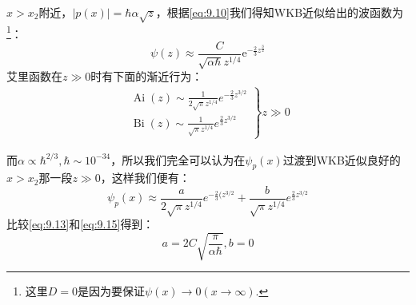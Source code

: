 \documentclass[a4paper,zihao=-4,linespread=1]{ctexrep}
\begin{document}
    $x>x_2$附近，$|p(x)|=\hbar\alpha\sqrt{z}$，根据\ref{eq:9.10}我们得知WKB近似给出的波函数为\footnote{这里$D=0$是因为要保证$\psi(x)\to 0(x\to\infty)$.}：
    \begin{equation}
        \label{eq:9.13}
        \psi(z)\approx\frac{C}{\sqrt{\alpha\hbar}z^{1/4}}\mathrm{e}^{-\frac{2}{3}z^{\frac{3}{2}}}
    \end{equation}
    艾里函数在$z\gg 0$时有下面的渐近行为：
    \begin{eqnarray}
        \left.\begin{array}{l}
            \operatorname{Ai}(z) \sim \frac{1}{2 \sqrt{\pi} z^{1 / 4}} e^{-\frac{2}{3} z^{3 / 2}} \\
            \operatorname{Bi}(z) \sim \frac{1}{\sqrt{\pi} z^{1 / 4}} e^{\frac{2}{3} z^{3 / 2}}
            \end{array}\right\} z \gg 0
    \end{eqnarray}
    
    而$\alpha\propto\hbar^{2/3},\hbar\sim 10^{-34}$，所以我们完全可以认为在$\psi_p(x)$过渡到WKB近似良好的$x>x_2$那一段$z\gg 0$，这样我们便有：
    \begin{equation}
        \label{eq:9.15}
        \psi_{p}(x) \approx \frac{a}{2 \sqrt{\pi}z^{1 / 4}} e^{-\frac{2}{3}(z^{3 / 2}}+\frac{b}{\sqrt{\pi}z^{1 / 4}} e^{\frac{2}{3}z^{3 / 2}}
    \end{equation}
    比较\ref{eq:9.13}和\ref{eq:9.15}得到：
    \[a=2C\sqrt{\frac{\pi}{\alpha\hbar}},b=0\]
\end{document}
